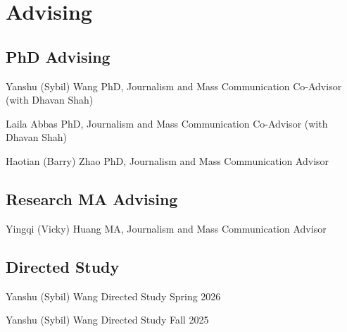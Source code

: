\section{Advising}


\subsection{PhD Advising}

\cvadvisee
  {Yanshu (Sybil) Wang}
  {PhD, Journalism and Mass Communication}
  {Co-Advisor (with Dhavan Shah)}
  {}
  {}

\cvadvisee
  {Laila Abbas}
  {PhD, Journalism and Mass Communication}
  {Co-Advisor (with Dhavan Shah)}
  {}
  {}

\cvadvisee
  {Haotian (Barry) Zhao}
  {PhD, Journalism and Mass Communication}
  {Advisor}
  {}
  {}

\subsection{Research MA Advising}

\cvadvisee
  {Yingqi (Vicky) Huang}
  {MA, Journalism and Mass Communication}
  {Advisor}
  {}
  {}

\subsection{Directed Study}

\cvadvisee
  {Yanshu (Sybil) Wang}
  {Directed Study}
  {}
  {}
  {Spring 2026}

\cvadvisee
  {Yanshu (Sybil) Wang}
  {Directed Study}
  {}
  {}
  {Fall 2025}
